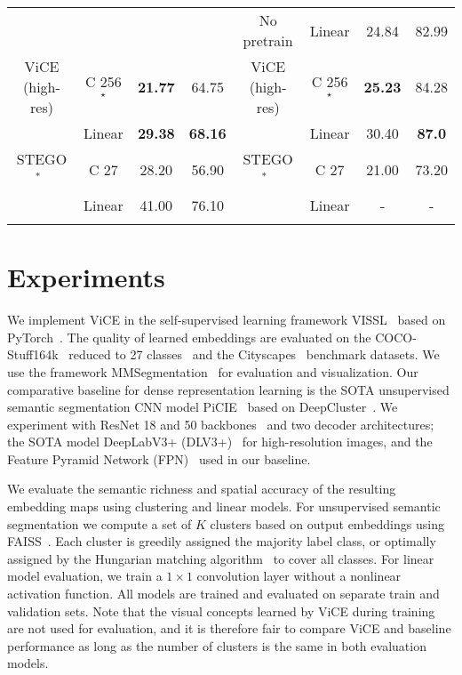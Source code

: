 \documentclass{bmvc2k}
\begin{document}
\begin{table}[ht]
\begin{center}
\begin{tabular}{cccc|cccc}
 & & & & No pretrain & Linear  & 24.84 & 82.99 \\
 ViCE (high-res) & C 256$^\star$   & \textbf{21.77} & 64.75 & ViCE (high-res) & C 256$^\star$ &  \textbf{25.23} & 84.28 \\
 & Linear   & \textbf{29.38} & \textbf{68.16} &  & Linear  & 30.40 & \textbf{87.0} \\
STEGO$^\ast$~\cite{Hamilton2022STEGO} & C 27   & 28.20 & 56.90 & STEGO$^\ast$~\cite{Hamilton2022STEGO} & C 27   & 21.00 & 73.20 \\
 & Linear   & 41.00 & 76.10 &  & Linear  & - & - \\
\hline\noalign{\smallskip}
\label{tab:low-res_results}
\end{tabular}
\end{center}
\end{table}
\setlength{\tabcolsep}{1.4pt}

\section{Experiments}
\label{sec:experiments}

We implement ViCE in the self-supervised learning framework VISSL~\cite{goyal2021vissl} based on PyTorch~\cite{Paszke2019Pytorch}. The quality of learned embeddings are evaluated on the COCO-Stuff164k~\cite{Lin2014COCO, Caesar2018COCOStuffTA} reduced to 27 classes~\cite{Ji2019IIC} and the Cityscapes~\cite{Cordts2016Cityscapes} benchmark datasets. We use the framework MMSegmentation~\cite{mmseg2020} for evaluation and visualization. Our comparative baseline for dense representation learning is the SOTA unsupervised semantic segmentation CNN model PiCIE~\cite{Cho2021PiCIE} based on DeepCluster~\cite{Caron2018DeepCluster}. We experiment with ResNet 18 and 50 backbones~\cite{He2016ResNet50} and two decoder architectures; the SOTA model DeepLabV3+ (DLV3+)~\cite{Chen2018DeepLabV3Plus} for high-resolution images, and the Feature Pyramid Network (FPN)~\cite{Lin2017FPN} used in our baseline.

We evaluate the semantic richness and spatial accuracy of the resulting embedding maps using clustering and linear models. For unsupervised semantic segmentation we compute a set of $K$ clusters based on output embeddings using FAISS~\cite{Johnson2019FAISS}. Each cluster is greedily assigned the majority label class, or optimally assigned by the Hungarian matching algorithm~\cite{Kuhn1955Hungarian} to cover all classes. For linear model evaluation, we train a $1 \times 1$ convolution layer without a nonlinear activation function. All models are trained and evaluated on separate train and validation sets. Note that the visual concepts learned by ViCE during training are not used for evaluation, and it is therefore fair to compare ViCE and baseline performance as long as the number of clusters is the same in both evaluation models. 
\end{document}
